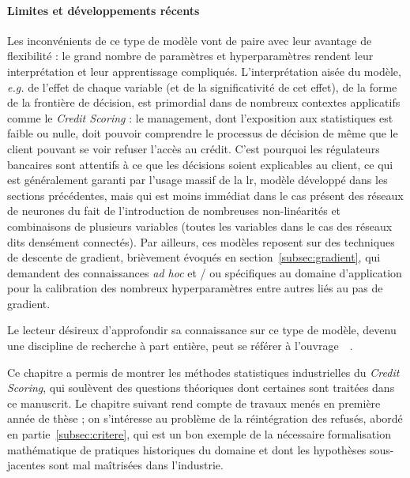 \paragraph{Limites et développements récents}

Les inconvénients de ce type de modèle vont de paire avec leur avantage de flexibilité : le grand nombre de paramètres et hyperparamètres rendent leur interprétation et leur apprentissage compliqués. L'interprétation aisée du modèle, \textit{e.g.} de l'effet de chaque variable (et de la significativité de cet effet), de la forme de la frontière de décision, est primordial dans de nombreux contextes applicatifs comme le \textit{Credit Scoring} : le management, dont l'exposition aux statistiques est faible ou nulle, doit pouvoir comprendre le processus de décision de même que le client pouvant se voir refuser l'accès au crédit. C'est pourquoi les régulateurs bancaires sont attentifs à ce que les décisions soient explicables au client, ce qui est généralement garanti par l'usage massif de la \gls{lr}, modèle développé dans les sections précédentes, mais qui est moins immédiat dans le cas présent des réseaux de neurones du fait de l'introduction de nombreuses non-linéarités et combinaisons de plusieurs variables (toutes les variables dans le cas des réseaux dits densément connectés). Par ailleurs, ces modèles reposent sur des techniques de descente de gradient, brièvement évoqués en section~\ref{subsec:gradient}, qui demandent des connaissances \textit{ad hoc} et / ou spécifiques au domaine d'application pour la calibration des nombreux hyperparamètres entre autres liés au pas de gradient.

Le lecteur désireux d'approfondir sa connaissance sur ce type de modèle, devenu une discipline de recherche à part entière, peut se référer à l'ouvrage~~\cite{goodfellow2016deep}.


\bigskip

Ce chapitre a permis de montrer les méthodes statistiques industrielles du \textit{Credit Scoring}, qui soulèvent des questions théoriques dont certaines sont traitées dans ce manuscrit. Le chapitre suivant rend compte de travaux menés en première année de thèse ; on s'intéresse au problème de la réintégration des refusés, abordé en partie~\ref{subsec:critere}, qui est un bon exemple de la nécessaire formalisation mathématique de pratiques historiques du domaine et dont les hypothèses sous-jacentes sont mal maîtrisées dans l'industrie.








\printbibliography[heading=subbibliography, title=Références du chapitre 1]